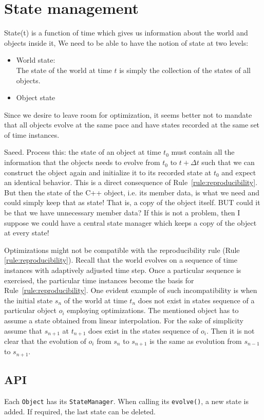 \documentclass[a4paper]{report}
\newcommand{\ai}[1]{{\color{blue}#1}}
\begin{document}
\chapter{State management}
State(t) is a function of time which gives us information about the world and objects inside it,
We need to be able to have the notion of state at two levels:
\begin{itemize}
	\item World state:\\
	The state of the world at time $t$ is simply the collection of the states of all objects.
	\item Object state
\end{itemize}
  Since we desire to leave room for optimization, it seems better not to mandate that all objects evolve at the same pace and have states recorded at the same set of time instances.

\ai{Saeed. Process this: the state of an object at time $t_0$ must contain all the information that the objects needs to evolve from $t_0$ to $t+\Delta t$ such that we can construct the object again and initialize it to its recorded state at $t_0$ and expect an identical behavior. This is a direct consequence of Rule~\ref{rule:reproducibility}. But then the state of the C++ object, i.e. its member data, is what we need and could simply keep that as state! That is, a copy of the object itself. BUT could it be that we have unnecessary member data? If this is not a problem, then I suppose we could have a central state manager which keeps a copy of the object at every state!}

Optimizations might not be compatible with the reproducibility rule (Rule \ref{rule:reproducibility}). Recall that the world evolves on a sequence of time instances with adaptively adjusted time step. Once a particular sequence is exercised, the particular time instances become the basis for Rule~\ref{rule:reproducibility}. One evident example of such incompatibility is when the initial state $s_n$ of the world at time $t_n$ does not exist in states sequence of a particular object $o_i$ employing optimizations. The mentioned object has to assume a state obtained from linear interpolation. For the sake of simplicity assume that $s_{n+1}$ at $t_{n+1}$ does exist in the states sequence of $o_i$. Then it is not clear that the evolution of $o_i$ from $s_n$ to $s_{n+1}$ is the same as evolution from $s_{n-1}$ to $s_{n+1}$. 

\section{API}
Each \verb+Object+ has its \verb+StateManager+. When calling its \verb+evolve()+, a new state is added. If required, the last state can be deleted. 
\end{document}

